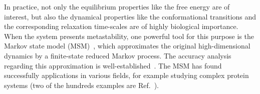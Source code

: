 \documentclass[epjST]{svjour}
\begin{document}
In practice, not only the equilibrium properties like the free energy are of interest,
but also the dynamical properties like the conformational transitions and the corresponding relaxation time-scales
are of highly biological importance.
When the system presents metastability,
one powerful tool for this purpose
is the Markov state model (MSM)~\cite{prinz2011probing,prinz2011markov,schuette2011markov}, which
approximates the original high-dimensional dynamics by a finite-state reduced
Markov process.
The accuracy analysis regarding  this approximation is well-established~\cite{sarich2010approximation,djurdjevac2012estimating}.
The MSM has found successfully applications in various fields, for example studying complex protein systems
(two of the hundreds examples are Ref.~\cite{noe2009constructing,kohlhoff2014cloud}).
\end{document}
